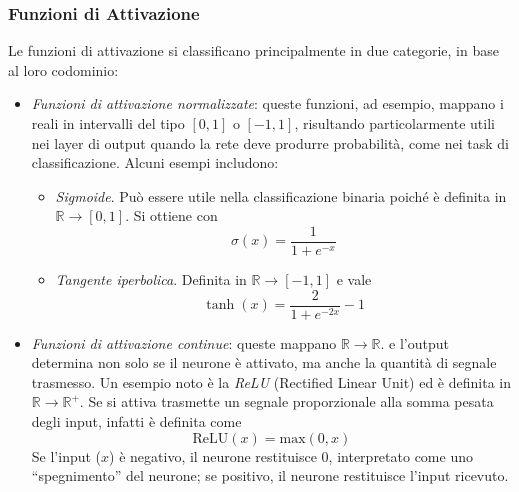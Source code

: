 \documentclass[12pt,a4paper,twoside,openright]{book}
\begin{document}
\subsubsection{Funzioni di Attivazione}
Le funzioni di attivazione si classificano principalmente in due categorie, in base al loro codominio: 
\begin{itemize}
    \item \emph{Funzioni di attivazione normalizzate}: queste funzioni, ad esempio, mappano i reali in intervalli del tipo $[0,1]$ o $[-1, 1]$, risultando particolarmente utili nei layer di output quando la rete deve produrre probabilità, come nei task di classificazione. Alcuni esempi includono:
    \begin{itemize}
        \item \emph{Sigmoide}. Può essere utile nella classificazione binaria poiché è definita in $\mathbb{R} \rightarrow [0,1]$. Si ottiene con
        \begin{equation*}
            \sigma(x) = \frac{1}{1+e^{-x}}
        \end{equation*}
        \item \emph{Tangente iperbolica}. Definita in $\mathbb{R} \rightarrow [-1,1]$ e vale
        \begin{equation*}
            \tanh(x) = \frac{2}{1+e^{-2x}} - 1
        \end{equation*}
    \end{itemize}
    \item \emph{Funzioni di attivazione continue}: queste mappano  $\mathbb{R} \rightarrow \mathbb{R}$. e l'output determina non solo se il neurone è attivato, ma anche la quantità di segnale trasmesso. Un esempio noto è la \emph{ReLU} (Rectified Linear Unit) ed è definita in $\mathbb{R} \rightarrow \mathbb{R}^+$. Se si attiva trasmette un segnale proporzionale alla somma pesata degli input, infatti è definita come
    \begin{equation*}
        \text{ReLU}(x) = \text{max}(0, x)
    \end{equation*}
    Se l'input ($x$) è negativo, il neurone restituisce 0, interpretato come uno ``spegnimento'' del neurone; se positivo, il neurone restituisce l'input ricevuto.
\end{itemize}
\end{document}

